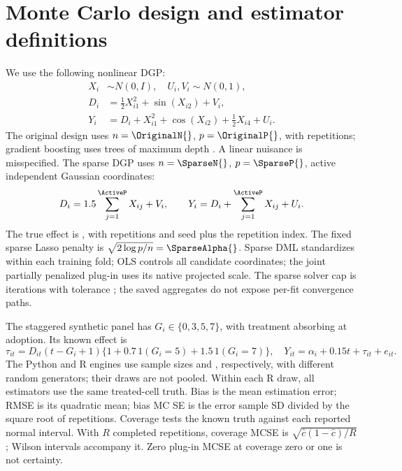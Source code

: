 \section{Monte Carlo design and estimator definitions}
We use the following nonlinear DGP:
\begin{align}
 X_i&\sim N(0, I),\quad U_i, V_i\sim N(0,1),\\
 D_i&=\tfrac12 X_{i1}^{2}+\sin(X_{i2})+V_i,\\
 Y_i&=D_i+X_{i1}^{2}+\cos(X_{i2})+\tfrac12 X_{i4}+U_i.
\end{align}
The original design uses $n=\OriginalN{}$, $p=\OriginalP{}$, with \Replications{} repetitions; gradient boosting uses \OriginalTrees{} trees of maximum depth \OriginalDepth{}. A linear nuisance is misspecified. The sparse DGP uses $n=\SparseN{}$, $p=\SparseP{}$, \ActiveP{} active independent Gaussian coordinates:
\begin{equation}
 D_i=1.5\sum_{j=1}^{\ActiveP}X_{ij}+V_i,\qquad
 Y_i=D_i+\sum_{j=1}^{\ActiveP}X_{ij}+U_i.
\end{equation}
The true effect is \TrueEffect{}, with \Replications{} repetitions and seed \SparseSeed{} plus the repetition index. The fixed sparse Lasso penalty is $\sqrt{2\log p/n}=\SparseAlpha{}$. Sparse DML standardizes within each training fold; OLS controls all candidate coordinates; the joint partially penalized plug-in uses its native projected scale. The sparse solver cap is \SparseIterations{} iterations with tolerance \SparseTolerance{}; the saved aggregates do not expose per-fit convergence paths.

The staggered synthetic panel has $G_i\in\{0,3,5,7\}$, with treatment absorbing at adoption. Its known effect is
\begin{equation}
 \tau_{it}=D_{it}(t-G_i+1)\{1+0.7\,1(G_i=5)+1.5\,1(G_i=7)\},
 \quad Y_{it}=\alpha_i+0.15t+\tau_{it}+e_{it}.
\end{equation}
The Python and R engines use sample sizes \PythonPanelN{} and \RPanelN{}, respectively, with different random generators; their draws are not pooled. Within each R draw, all estimators use the same treated-cell truth. Bias is the mean estimation error; RMSE is its quadratic mean; bias MC SE is the error sample SD divided by the square root of repetitions. Coverage tests the known truth against each reported normal interval. With $R$ completed repetitions, coverage MCSE is $\sqrt{\widehat c(1-\widehat c)/R}$; Wilson intervals accompany it. Zero plug-in MCSE at coverage zero or one is not certainty.


